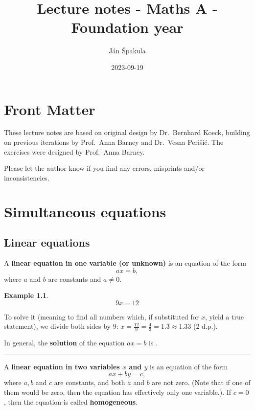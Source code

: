 \documentclass[
  12pt,
  oneside]{book}
\title{Lecture notes - Maths A - Foundation year}
\author{Ján Špakula}
\date{2023-09-19}
\theoremstyle{definition}
\theoremstyle{definition}
\newtheorem{example}{Example}[chapter]
\theoremstyle{definition}
\theoremstyle{definition}
\theoremstyle{remark}
\begin{document}
\maketitle

{
\setcounter{tocdepth}{1}
\tableofcontents
}
\chapter*{Front Matter}\label{front-matter}

These lecture notes are based on original design by Dr.~Bernhard Koeck, building on previous iterations by Prof.~Anna Barney and Dr.~Vesna Perišić. The exercises were designed by Prof.~Anna Barney.

Please let the author know if you find any errors, misprints and/or inconsistencies.

\chapter{Simultaneous equations}\label{simeq}

\section{Linear equations}\label{linear-equations}

A \textbf{linear equation in one variable (or unknown)} is an equation of the form
\[ax=b,\]
where \(a\) and \(b\) are constants and \(a\neq 0\).

\begin{example}
\protect\hypertarget{exm:unnamed-chunk-3}{}\label{exm:unnamed-chunk-3}\[9x=12\]
\end{example}

To solve it (meaning to find all numbers which, if substituted for \(x\), yield a true statement), we divide both sides by \(9\): \(x = \frac{12}{9} = \frac{4}{3} = 1.\overline{3} \approx 1.33\) (2 d.p.).

In general, the \textbf{solution} of the equation \(ax=b\) is .

\begin{center}\rule{0.5\linewidth}{0.5pt}\end{center}

A \textbf{linear equation in two variables \(x\) and \(y\)} is an equation of the form
\[ax+by=c,\]
where \(a,b\) and \(c\) are constants, and both \(a\) and \(b\) are not zero. (Note that if one of them would be zero, then the equation has effectively only one variable.). If \(c=0\), then the equation is called \textbf{homogeneous}.
\end{document}
